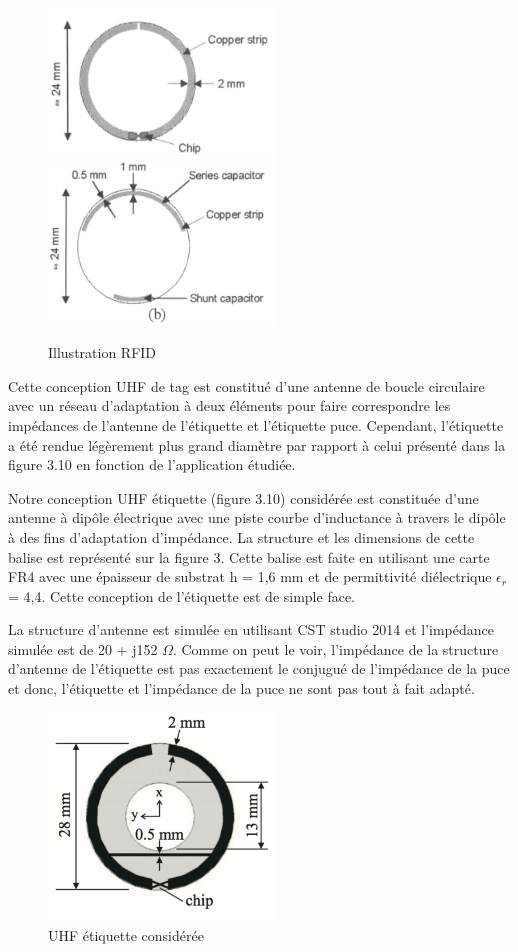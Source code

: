 \documentclass[11pt, a4paper, twoside]{book}
\begin{document}
\begin{figure}[H]
\centering
\includegraphics[width=6cm]{front}
\includegraphics[width=6cm]{back}
\caption{Illustration RFID}
\end{figure}

Cette conception UHF de tag est constitué d'une antenne de boucle circulaire avec un réseau d'adaptation à deux éléments pour faire correspondre les impédances de l'antenne de l'étiquette et l'étiquette puce. Cependant, l'étiquette a été rendue légèrement plus grand diamètre par rapport à celui présenté dans la figure 3.10 en fonction de l'application étudiée. 

Notre conception UHF étiquette (figure 3.10) considérée est constituée d'une antenne à dipôle électrique avec une piste courbe d'inductance à travers le dipôle à des fins d'adaptation d'impédance. La structure et les dimensions de cette balise est représenté sur la figure 3. Cette balise est faite en utilisant une carte FR4 avec une épaisseur de substrat h = 1,6 mm et de permittivité diélectrique \(\epsilon_{r}\) = 4,4. Cette conception de l'étiquette est de simple face.

 La structure d'antenne est simulée en utilisant CST studio 2014 et l'impédance simulée est de 20 + j152 \(\Omega\). Comme on peut le voir, l'impédance de la structure d'antenne de l'étiquette est pas exactement le conjugué de l'impédance de la puce \cite{alien} et donc, l'étiquette et l'impédance de la puce ne sont pas tout à fait adapté.
\begin{figure}[H]
\centering
\includegraphics[width=6cm]{dofi}
\caption{UHF étiquette considérée}
\end{figure}
\end{document}
